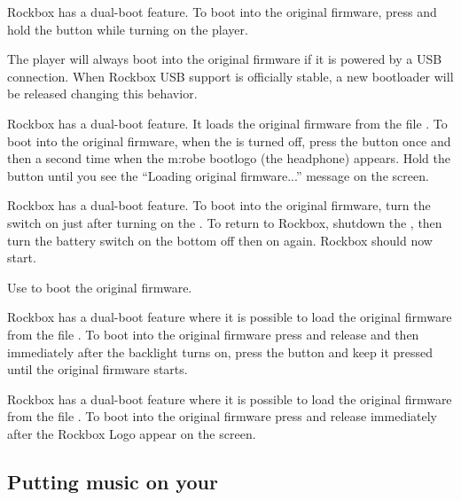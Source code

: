{  
    {
    Rockbox has a dual-boot feature. To boot into the original firmware,
    press and hold the \ButtonLeft{} button while turning on the player.
    }

    {
    The player will always boot into the original firmware if it is powered
    by a USB connection.  When Rockbox USB support is officially stable,
    a new bootloader will be released changing this behavior.
    }

    {
    Rockbox has a dual-boot feature. It loads the original firmware from
    the file . To boot into the original firmware,
    when the \dap{} is turned off, press the \ButtonPower{} button once and then 
    a second time when the m:robe bootlogo (the headphone) appears. Hold the
    \ButtonPower{} button until you see the ``Loading original firmware...'' 
    message on the screen.
    }

    {
    Rockbox has a dual-boot feature. To boot into the original firmware,
    turn the \ButtonHold{} switch on just after turning on the \dap{}.
    To return to Rockbox, shutdown the \dap{}, then turn the battery switch
    on the bottom off then on again. Rockbox should now start.
    }

    {
    Use \ButtonPower{} to boot the original \playerman{} firmware.
    }

    {
    Rockbox has a dual-boot feature where it is possible to load the original firmware from
    the file . To boot into the original firmware press and release
    \ButtonPower{} and then immediately after the backlight turns on, press the \ButtonOK{}
    button and keep it pressed until the original firmware starts.
    }

    {
    Rockbox has a dual-boot feature where it is possible to load the original firmware from
    the file . To boot into the original firmware press and release
    \ButtonPower{} immediately after the Rockbox Logo appear on the screen.
    }

  }
\subsection{Putting music on your \dap{}}


